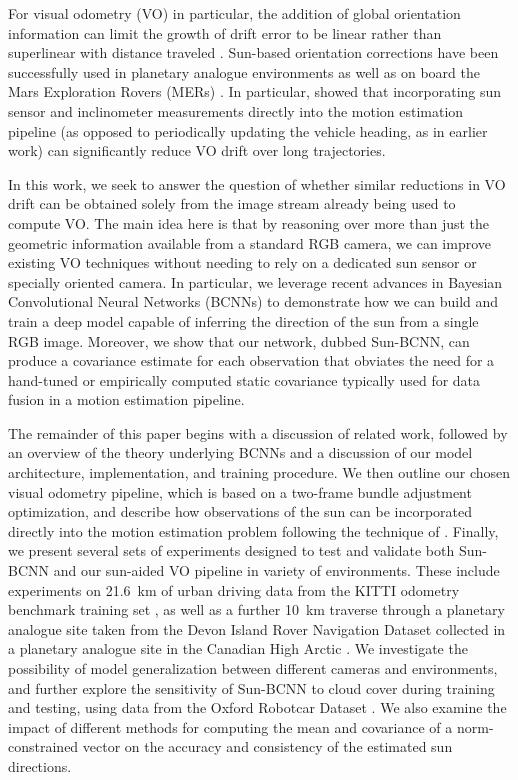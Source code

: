 For visual odometry (VO) in particular, the addition of global orientation information can limit the growth of drift error to be linear rather than superlinear with distance traveled \citep{Olson2003-ax}.
Sun-based orientation corrections have been successfully used in planetary analogue environments \citep{Furgale2011-zu,Lambert2012-um} as well as on board the Mars Exploration Rovers (MERs) \citep{Eisenman2002-cg,Maimone2007-tc}.
In particular, \citet{Lambert2012-um} showed that incorporating sun sensor and inclinometer measurements directly into the motion estimation pipeline (as opposed to periodically updating the vehicle heading, as in earlier work) can significantly reduce VO drift over long trajectories.

In this work, we seek to answer the question of whether similar reductions in VO drift can be obtained solely from the image stream already being used to compute VO.
The main idea here is that by reasoning over more than just the geometric information available from a standard RGB camera, we can improve existing VO techniques without needing to rely on a dedicated sun sensor or specially oriented camera.
In particular, we leverage recent advances in Bayesian Convolutional Neural Networks (BCNNs) to demonstrate how we can build and train a deep model capable of inferring the direction of the sun from a single RGB image. 
Moreover, we show that our network, dubbed Sun-BCNN, can produce a covariance estimate for each observation that obviates the need for a hand-tuned or empirically computed static covariance typically used for data fusion in a motion estimation pipeline. 


The remainder of this paper begins with a discussion of related work, followed by an overview of the theory underlying BCNNs and a discussion of our model architecture, implementation, and training procedure.
We then outline our chosen visual odometry pipeline, which is based on a two-frame bundle adjustment optimization, and describe how observations of the sun can be incorporated directly into the motion estimation problem following the technique of \citet{Lambert2012-um}.
Finally, we present several sets of experiments designed to test and validate both Sun-BCNN and our sun-aided VO pipeline in variety of environments.
These include experiments on 21.6~km of urban driving data from the KITTI odometry benchmark training set \citep{Geiger2012-fq}, as well as a further 10~km traverse through a planetary analogue site taken from the Devon Island Rover Navigation Dataset collected in a planetary analogue site in the Canadian High Arctic \citep{Furgale2012-kk}.
We investigate the possibility of model generalization between different cameras and environments, and further explore the sensitivity of Sun-BCNN to cloud cover during training and testing, using data from the Oxford Robotcar Dataset \citep{Maddern2016-ng}.
We also examine the impact of different methods for computing the mean and covariance of a norm-constrained vector on the accuracy and consistency of the estimated sun directions.

